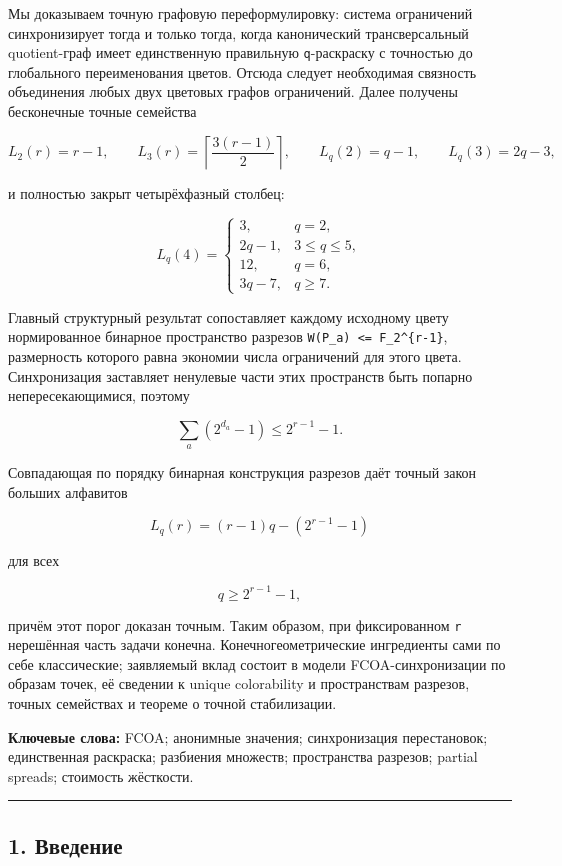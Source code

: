 Мы доказываем точную графовую переформулировку: система ограничений
синхронизирует тогда и только тогда, когда канонический трансверсальный
quotient-граф имеет единственную правильную \texttt{q}-раскраску с
точностью до глобального переименования цветов. Отсюда следует
необходимая связность объединения любых двух цветовых графов
ограничений. Далее получены бесконечные точные семейства

\[
L_2(r)=r-1,
\qquad
L_3(r)=\left\lceil\frac{3(r-1)}2\right\rceil,
\qquad
L_q(2)=q-1,
\qquad
L_q(3)=2q-3,
\]

и полностью закрыт четырёхфазный столбец:

\[
L_q(4)=
\begin{cases}
3,&q=2,\\
2q-1,&3\le q\le5,\\
12,&q=6,\\
3q-7,&q\ge7.
\end{cases}
\]

Главный структурный результат сопоставляет каждому исходному цвету
нормированное бинарное пространство разрезов
\texttt{W(P\_a)\ \textless{}=\ F\_2\^{}\{r-1\}}, размерность которого
равна экономии числа ограничений для этого цвета. Синхронизация
заставляет ненулевые части этих пространств быть попарно
непересекающимися, поэтому

\[
\sum_a(2^{d_a}-1)\le2^{r-1}-1.
\]

Совпадающая по порядку бинарная конструкция разрезов даёт точный закон
больших алфавитов

\[
\boxed{L_q(r)=(r-1)q-(2^{r-1}-1)}
\]

для всех

\[
q\ge2^{r-1}-1,
\]

причём этот порог доказан точным. Таким образом, при фиксированном
\texttt{r} нерешённая часть задачи конечна. Конечногеометрические
ингредиенты сами по себе классические; заявляемый вклад состоит в модели
FCOA-синхронизации по образам точек, её сведении к unique colorability и
пространствам разрезов, точных семействах и теореме о точной
стабилизации.

\textbf{Ключевые слова:} FCOA; анонимные значения; синхронизация
перестановок; единственная раскраска; разбиения множеств; пространства
разрезов; partial spreads; стоимость жёсткости.

\begin{center}\rule{0.5\linewidth}{0.5pt}\end{center}

\hypertarget{ux432ux432ux435ux434ux435ux43dux438ux435}{%
\subsection{1.
Введение}\label{ux432ux432ux435ux434ux435ux43dux438ux435}}

